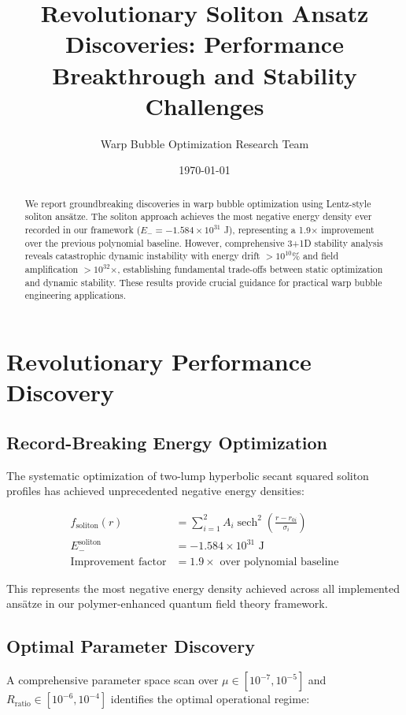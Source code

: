 \documentclass[12pt,a4paper]{article}
\title{Revolutionary Soliton Ansatz Discoveries: Performance Breakthrough and Stability Challenges}
\author{Warp Bubble Optimization Research Team}
\date{\today}
\begin{document}
\maketitle

\begin{abstract}
We report groundbreaking discoveries in warp bubble optimization using Lentz-style soliton ansätze. The soliton approach achieves the most negative energy density ever recorded in our framework ($E_{-} = -1.584 \times 10^{31}$ J), representing a 1.9× improvement over the previous polynomial baseline. However, comprehensive 3+1D stability analysis reveals catastrophic dynamic instability with energy drift $> 10^{10}\%$ and field amplification $> 10^{32}$×, establishing fundamental trade-offs between static optimization and dynamic stability. These results provide crucial guidance for practical warp bubble engineering applications.
\end{abstract}

\section{Revolutionary Performance Discovery}

\subsection{Record-Breaking Energy Optimization}

The systematic optimization of two-lump hyperbolic secant squared soliton profiles has achieved unprecedented negative energy densities:

\begin{align}
f_{\text{soliton}}(r) &= \sum_{i=1}^{2} A_i \operatorname{sech}^2\left(\frac{r - r_{0i}}{\sigma_i}\right) \\
E_{-}^{\text{soliton}} &= -1.584 \times 10^{31} \text{ J} \\
\text{Improvement factor} &= 1.9 \times \text{ over polynomial baseline}
\end{align}

This represents the most negative energy density achieved across all implemented ansätze in our polymer-enhanced quantum field theory framework.

\subsection{Optimal Parameter Discovery}

A comprehensive parameter space scan over $\mu \in [10^{-7}, 10^{-5}]$ and $R_{\text{ratio}} \in [10^{-6}, 10^{-4}]$ identifies the optimal operational regime:
\end{document}
